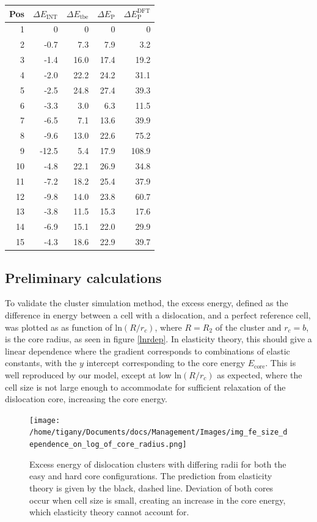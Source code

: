 \documentclass[a4paper,11pt]{article}
\begin{document}
\begin{center}
\begin{tabular}{rrrrr}
Pos & \(\Delta E_{\text{INT}}\) & \(\Delta E_{\text{tbe}}\) & \(\Delta E_{\text{P}}\) & \(\Delta E_{\text{P}}^{\text{DFT}}\)\\
\hline
1 & 0 & 0 & 0 & 0\\
2 & -0.7 & 7.3 & 7.9 & 3.2\\
3 & -1.4 & 16.0 & 17.4 & 19.2\\
4 & -2.0 & 22.2 & 24.2 & 31.1\\
5 & -2.5 & 24.8 & 27.4 & 39.3\\
6 & -3.3 & 3.0 & 6.3 & 11.5\\
7 & -6.5 & 7.1 & 13.6 & 39.9\\
8 & -9.6 & 13.0 & 22.6 & 75.2\\
9 & -12.5 & 5.4 & 17.9 & 108.9\\
10 & -4.8 & 22.1 & 26.9 & 34.8\\
11 & -7.2 & 18.2 & 25.4 & 37.9\\
12 & -9.8 & 14.0 & 23.8 & 60.7\\
13 & -3.8 & 11.5 & 15.3 & 17.6\\
14 & -6.9 & 15.1 & 22.0 & 29.9\\
15 & -4.3 & 18.6 & 22.9 & 39.7\\
\end{tabular}
\end{center}

\subsection{Preliminary calculations}
\label{sec:org422175f}


To validate the cluster simulation method, the excess energy, defined as the difference in energy
between a cell with a dislocation, and a perfect reference cell, was plotted as as function of
\(\text{ln}(R/r_c)\), where \(R = R_2\) of the cluster and \(r_c = b\), is the core radius, as seen in
figure \ref{lnrdep}. In elasticity theory, this should give a linear dependence where the gradient
corresponds to combinations of elastic constants, with the \(y\) intercept corresponding to the
core energy \(E_{\text{core}}\). This is well reproduced by our model, except at low \(\text{ln}(R/r_c)\)
as expected, where the cell size is not large enough to accommodate for sufficient relaxation of
the dislocation core, increasing the core energy.

\begin{figure}[htbp]
\centering
\texttt{[image: /home/tigany/Documents/docs/Management/Images/img\_fe\_size\_dependence\_on\_log\_of\_core\_radius.png]}
\caption{\label{fig:org722ee91}
Excess energy of dislocation clusters with differing radii for both the easy and hard core configurations. The prediction from elasticity theory is given by the black, dashed line. Deviation of both cores occur when cell size is small, creating an increase in the core energy, which elasticity theory cannot account for.}
\end{figure}
\end{document}
